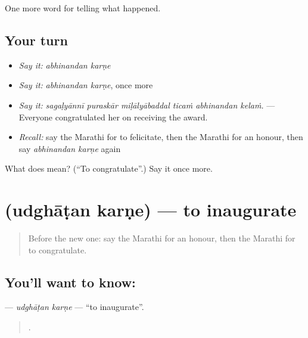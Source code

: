 \begin{grammarlens}[title={What you've built}]
One more word for telling what happened.
\end{grammarlens}

\subsection*{Your turn}
\begin{itemize}
\raggedright
  \item \emph{Say it:} \emph{abhinandan karṇe}
  \item \emph{Say it:} \emph{abhinandan karṇe}, once more
  \item \emph{Say it:} \emph{sagaḷyānnī puraskār miḷālyābaddal ticaṁ abhinandan kelaṁ.} — Everyone congratulated her on receiving the award.
  \item \emph{Recall:} say the Marathi for to felicitate, then the Marathi for an honour, then say \emph{abhinandan karṇe} again
\end{itemize}

\begin{tcolorbox}[breakable,colback=teal!4,colframe=teal!35!black,title={Before you move on}]
What does   mean? (\textquotedblleft{}To congratulate\textquotedblright{}.) Say it once more.
\end{tcolorbox}
\section[\texorpdfstring{\mr{उद्घाटन} \mr{करणे} (udghāṭan karṇe)}{उद्घाटन करणे (udghāṭan karṇe)}]{  (udghāṭan karṇe) — to inaugurate}

\label{lesson:MR-C322-udghatan-karne}



\begin{quote}
Before the new one: say the Marathi for an honour, then the Marathi for to congratulate.
\end{quote}

\subsection*{You'll want to know:  }
\textbf{ } — \emph{udghāṭan karṇe} — \textquotedblleft{}to inaugurate\textquotedblright{}.

\begin{quote}
    .
\end{quote}

